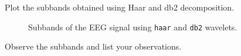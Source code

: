 \begin{tcolorbox}[colback=green!5!white,colframe=green!75!black,title=Problem 2.c]
    Plot the subbands obtained using Haar and db2 decomposition.
\end{tcolorbox}

\begin{figure}[H]
    \centering
    \caption{Subbands of the EEG signal using \texttt{haar} and \texttt{db2} wavelets.}
    \label{fig:problem2c_haar_and_db2_subband_decomposition}
\end{figure}


\begin{tcolorbox}[colback=green!5!white,colframe=green!75!black,title=Problem 2.d]
    Observe the subbands and list your observations.
\end{tcolorbox}

